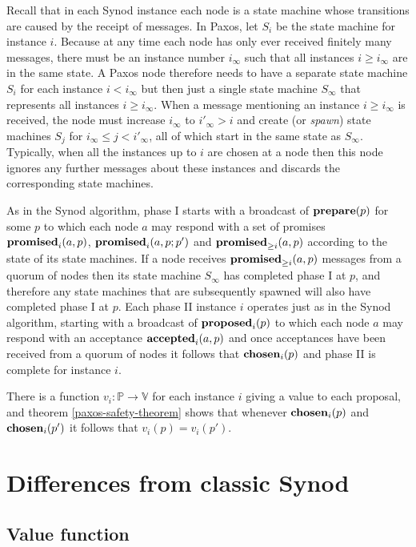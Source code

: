 \documentclass[journal]{IEEEtran}
\begin{document}
Recall that in each Synod instance each node is a state machine whose
transitions are caused by the receipt of messages. In Paxos, let $S_i$ be the
state machine for instance $i$. Because at any time each node has only ever
received finitely many messages, there must be an instance number $i_\infty$
such that all instances $i \ge i_\infty$ are in the same state. A Paxos node
therefore needs to have a separate state machine $S_i$ for each instance $i <
i_\infty$ but then just a single state machine $S_\infty$ that represents all
instances $i \ge i_\infty$. When a message mentioning an instance $i \ge
i_\infty$ is received, the node must increase $i_\infty$ to $i'_\infty > i$ and
create (or \textit{spawn}) state machines $S_j$ for $i_\infty \le j <
i'_\infty$, all of which start in the same state as $S_\infty$. Typically, when
all the instances up to $i$ are chosen at a node then this node ignores any
further messages about these instances and discards the corresponding state
machines.

As in the Synod algorithm, phase I starts with a broadcast of $\mathbf{prepare}(p)$ for
some $p$ to which each node $a$ may respond with a set of promises
$\mathbf{promised}_{i}(a,p)$, $\mathbf{promised}_{i}(a,p;p')$ and $\mathbf{promised}_{\ge i}(a,p)$ according to the
state of its state machines. If a node receives $\mathbf{promised}_{\ge i}(a,p)$ messages from
a quorum of nodes then its state machine $S_\infty$ has completed phase I at
$p$, and therefore any state machines that are subsequently spawned will also
have completed phase I at $p$. Each phase II instance $i$ operates just as in
the Synod algorithm, starting with a broadcast of $\mathbf{proposed}_{i}(p)$ to which each
node $a$ may respond with an acceptance $\mathbf{accepted}_{i}(a,p)$ and once acceptances
have been received from a quorum of nodes it follows that $\mathbf{chosen}_{i}(p)$ and
phase II is complete for instance $i$.

There is a function $v_i : \mathbb P \to \mathbb V$ for each instance $i$
giving a value to each proposal, and theorem \ref{paxos-safety-theorem} shows
that whenever $\mathbf{chosen}_{i}(p)$ and $\mathbf{chosen}_{i}(p')$ it follows that $v_i(p) =
v_i(p')$.

\section{Differences from classic Synod} \label{deviations-from-classic}

\subsection{Value function}
\end{document}
